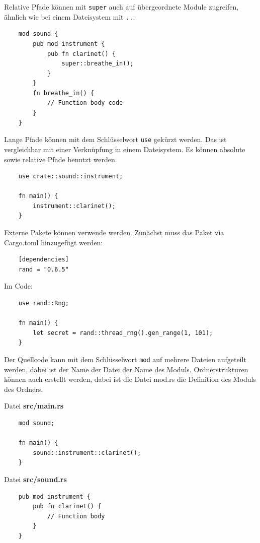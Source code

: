 Relative Pfade können mit \verb"super" auch auf übergeordnete Module zugreifen, ähnlich wie bei einem Dateisystem mit \glqq\verb".."\grqq{}:

\begin{lstlisting}
    mod sound {
        pub mod instrument {
            pub fn clarinet() {
                super::breathe_in();
            }
        }
        fn breathe_in() {
            // Function body code
        }
    }
\end{lstlisting}

Lange Pfade können mit dem Schlüsselwort \verb"use" gekürzt werden. Das ist vergleichbar mit einer Verknüpfung in einem Dateisystem. Es können absolute sowie relative Pfade benutzt werden.

\begin{lstlisting}
    use crate::sound::instrument;

    fn main() {
        instrument::clarinet();
    }
\end{lstlisting}

Externe Pakete können verwende werden. Zunächst muss das Paket via Cargo.toml hinzugefügt werden:

\begin{lstlisting}
    [dependencies]
    rand = "0.6.5"
\end{lstlisting}

Im Code:

\begin{lstlisting}
    use rand::Rng;

    fn main() {
        let secret = rand::thread_rng().gen_range(1, 101);
    }
\end{lstlisting}

Der Quellcode kann mit dem Schlüsselwort \verb"mod" auf mehrere Dateien aufgeteilt werden, dabei ist der Name der Datei der Name des Moduls. Ordnerstrukturen können auch erstellt werden, dabei ist die Datei mod.rs die Definition des Moduls des Ordners.

Datei \textbf{src/main.rs}

\begin{lstlisting}
    mod sound;

    fn main() {
        sound::instrument::clarinet();
    }
\end{lstlisting}

\vspace{1cm}

Datei \textbf{src/sound.rs}

\begin{lstlisting}
    pub mod instrument {
        pub fn clarinet() {
            // Function body
        }
    }
\end{lstlisting}



